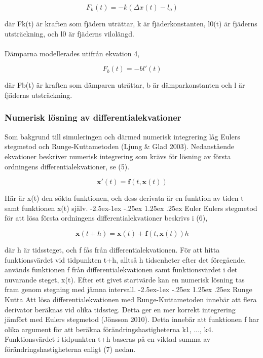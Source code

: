 \documentclass[a4paper,12pt,oneside,final,swedish]{extarticle}
\makeatletter
\renewcommand\paragraph{\@startsection{paragraph}{4}{\z@}%
            {-2.5ex\@plus -1ex \@minus -.25ex}%
            {1.25ex \@plus .25ex}%
            {\normalfont\normalsize\bfseries}}
\makeatother
\begin{document}
\begin{equation}
	{ F }_{ k }(t)=-k(\Delta x(t)-{ l }_{ o })
\end{equation}

där Fk(t) är kraften som fjädern uträttar, k är fjäderkonstanten, l0(t) är fjäderns utsträckning, och l0 är fjäderns vilolängd.
\\\\Dämparna modellerades utifrån ekvation 4,

\begin{equation}
{ F }_{ b }(t)=-bl'(t)
\end{equation}

där Fb(t) är kraften som dämparen uträttar, b är dämparkonstanten och l är fjäderns utsträckning.

\subsubsection{Numerisk lösning av differentialekvationer}
Som bakgrund till simuleringen och därmed numerisk integrering låg Eulers stegmetod och Runge-Kuttametoden (Ljung \& Glad 2003). Nedanstående ekvationer beskriver numerisk integrering som krävs för lösning av första ordningens differentialekvationer, se (5).

\begin{equation}
\mathbf x'(t)=\mathbf f(t,\mathbf x(t))
\end{equation}

Här är x(t) den sökta funktionen, och dess derivata är en funktion av tiden t samt funktionen x(t) själv.
\paragraph{Euler}%
Eulers stegmetod för att lösa första ordningens differentialekvationer beskrivs i (6),

\begin{equation}
\mathbf x(t+h)=\mathbf x(t)+\mathbf f(t,\mathbf x(t))h
\end{equation}

där h är tidssteget, och f fås från differentialekvationen. För att hitta funktionsvärdet vid tidpunkten t+h, alltså h tidsenheter efter det föregående, används funktionen f från differentialekvationen samt funktionsvärdet i det nuvarande steget, x(t). Efter ett givet startvärde kan en numerisk lösning tas fram genom stegning med jämna intervall.
\paragraph{Runge Kutta}%
Att lösa differentialekvationen med Runge-Kuttametoden innebär att flera derivator beräknas vid olika tidssteg. Detta ger en mer korrekt integrering jämfört med Eulers stegmetod (Jönsson 2010). Detta innebär att funktionen f har olika argument för att beräkna förändringshastigheterna k1, ..., k4. Funktionsvärdet i tidpunkten t+h baseras på en viktad summa av förändringshastigheterna enligt (7) nedan.
\end{document}

